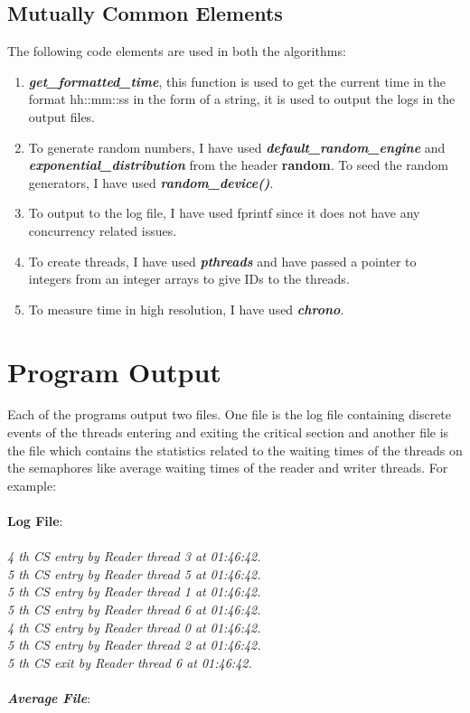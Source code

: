 \documentclass[a4paper,12pt]{report}
\begin{document}
\subsection{Mutually Common Elements}
The following code elements are used in both the algorithms:
\begin{enumerate}
\item \textbf{\textit{get\_formatted\_time}}, this function is used to get the current time in the format hh::mm::ss in the form of a string, it is used to output the logs in the output  files.
\item To generate random numbers, I have used \textbf{\textit{default\_random\_engine}} and  \textbf{\textit{exponential\_distribution}} from the header \textbf{random}. To seed the random generators, I have used \textit{\textbf{random\_device{}()}}.
\item To output to the log file, I have used fprintf since it does not have any concurrency related issues.
\item To create threads, I have used \textit{\textbf{pthreads}} and have passed a pointer to integers from an integer arrays to give IDs to the threads.
\item To measure time in high resolution, I have used \textit{\textbf{chrono}}.
\end{enumerate}
\newpage
\section{Program Output}
Each of the programs output two files. One file is the log file containing discrete events of the threads entering and exiting the critical section and another file is the file which contains the statistics related to the waiting times of the threads on the semaphores like average waiting times of the reader and writer threads.
For example:\\\\
\textbf{Log File}:\\\\
\textit{4 th CS entry by Reader thread 3 at 01:46:42.\\
5 th CS entry by Reader thread 5 at 01:46:42.\\
5 th CS entry by Reader thread 1 at 01:46:42.\\
5 th CS entry by Reader thread 6 at 01:46:42.\\
4 th CS entry by Reader thread 0 at 01:46:42.\\
5 th CS entry by Reader thread 2 at 01:46:42.\\
5 th CS exit by Reader thread 6 at 01:46:42.\\\\}
\textit{\textbf{Average File}}:
\newpage
\end{document}
